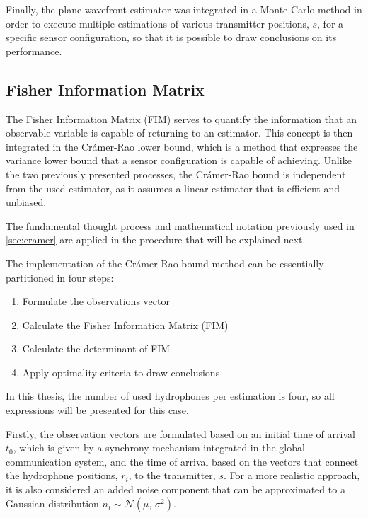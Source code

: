 Finally, the plane wavefront estimator was integrated in a Monte Carlo method in order to execute multiple estimations of various transmitter positions, $s$, for a specific sensor configuration, so that it is possible to draw conclusions on its performance.

\subsection{Fisher Information Matrix} \label{sucsec:FIM}

The Fisher Information Matrix (FIM) serves to quantify the information that an observable variable is capable of returning to an estimator. This concept is then integrated in the Crámer-Rao lower bound, which is a method that expresses the variance lower bound that a sensor configuration is capable of achieving. Unlike the two previously presented processes, the Crámer-Rao bound is independent from the used estimator, as it assumes a linear estimator that is efficient and unbiased.

The fundamental thought process and mathematical notation previously used in \ref{sec:cramer} are applied in the procedure that will be explained next.

The implementation of the Crámer-Rao bound method can be essentially partitioned in four steps:

\begin{enumerate}
	
	\item Formulate the observations vector
	\item Calculate the Fisher Information Matrix (FIM)
	\item Calculate the determinant of FIM 
	\item Apply optimality criteria to draw conclusions
	
\end{enumerate}

In this thesis, the number of used hydrophones per estimation is four, so all expressions will be presented for this case.

Firstly, the observation vectors are formulated based on an initial time of arrival $t_0$, which is given by a synchrony mechanism integrated in the global communication system, and the time of arrival based on the vectors that connect the hydrophone positions, $r_i$, to the transmitter, $s$. For a more realistic approach, it is also considered an added noise component that can be approximated to a Gaussian distribution $n_i \sim \mathcal{N}(\mu,\,\sigma^{2})$. 

